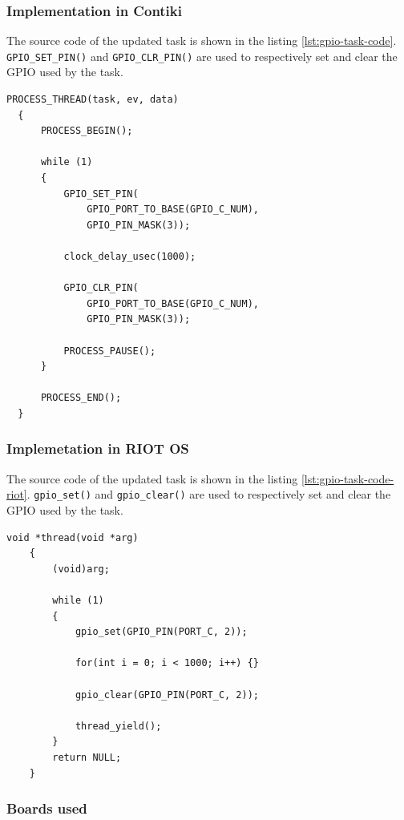 \subsubsection{Implementation in Contiki}
The source code of the updated task is shown in the listing \ref{lst:gpio-task-code}.
\texttt{GPIO\_SET\_PIN()} and \texttt{GPIO\_CLR\_PIN()} are used to respectively set and clear the GPIO used by the task.

\begin{lstlisting}[style=CStyle, float, label={lst:gpio-task-code}, caption={Source code of the task with GPIO calls}]
  PROCESS_THREAD(task, ev, data)
  {
      PROCESS_BEGIN();
  
      while (1)
      {
          GPIO_SET_PIN(
              GPIO_PORT_TO_BASE(GPIO_C_NUM), 
              GPIO_PIN_MASK(3));

          clock_delay_usec(1000);

          GPIO_CLR_PIN(
              GPIO_PORT_TO_BASE(GPIO_C_NUM), 
              GPIO_PIN_MASK(3));

          PROCESS_PAUSE();
      }
  
      PROCESS_END();
  }
\end{lstlisting}

\subsubsection{Implemetation in RIOT OS}
The source code of the updated task is shown in the listing \ref{lst:gpio-task-code-riot}.
\texttt{gpio\_set()} and \texttt{gpio\_clear()} are used to respectively set and clear the GPIO used by the task.

\begin{lstlisting}[style=CStyle, float, label={lst:gpio-task-code-riot}, caption={Source code of a task implemented in RIOT OS for the simple application}]
    void *thread(void *arg)
    {
        (void)arg;
    
        while (1)
        {
            gpio_set(GPIO_PIN(PORT_C, 2));

            for(int i = 0; i < 1000; i++) {}

            gpio_clear(GPIO_PIN(PORT_C, 2));

            thread_yield();
        }
        return NULL;
    }
    \end{lstlisting}

\subsubsection{Boards used}

